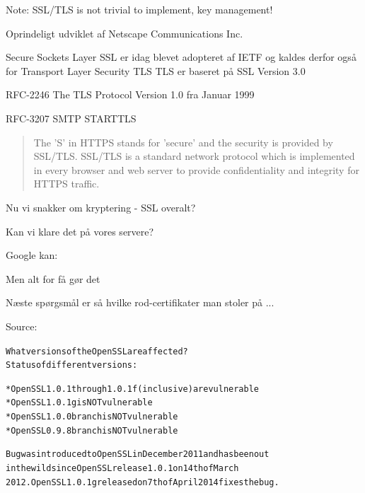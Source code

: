 \documentclass[20pt,landscape,a4paper,footrule]{foils}
\begin{document}
\centerline{Note: SSL/TLS is not trivial to implement, key management!}



\begin{list1}
\item Oprindeligt udviklet af Netscape Communications Inc.
\item Secure Sockets Layer SSL er idag blevet adopteret af IETF og kaldes
derfor også for Transport Layer Security TLS
TLS er baseret på SSL Version 3.0
\item RFC-2246 The TLS Protocol Version 1.0 fra Januar 1999
\item RFC-3207 SMTP STARTTLS
\end{list1}



\begin{quote}
The 'S' in HTTPS stands for 'secure' and the security is provided by SSL/TLS. SSL/TLS is a standard network protocol which is implemented in every browser and web server to provide confidentiality and integrity for HTTPS traffic.
\end{quote}

\begin{list1}
\item Nu vi snakker om kryptering - SSL overalt?
\item Kan vi klare det på vores servere?
\pause
\item Google kan:\\
\item Men alt for få gør det
\end{list1}
\pause
\centerline{Næste spørgsmål er så hvilke rod-certifikater man stoler på ...}





Source: 


\begin{alltt}
What versions of the OpenSSL are affected?
Status of different versions:

* OpenSSL 1.0.1 through 1.0.1f (inclusive) are vulnerable
* OpenSSL 1.0.1g is NOT vulnerable
* OpenSSL 1.0.0 branch is NOT vulnerable
* OpenSSL 0.9.8 branch is NOT vulnerable

Bug was introduced to OpenSSL in December 2011 and has been out
in the wild since OpenSSL release 1.0.1 on 14th of March
2012. OpenSSL 1.0.1g released on 7th of April 2014 fixes the bug.
\end{alltt}
\end{document}
